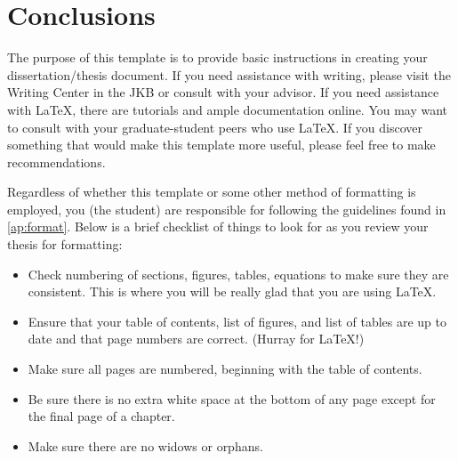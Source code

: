 \chapter{Conclusions}

The purpose of this template is to provide basic instructions in creating your dissertation/thesis document. If you need assistance with writing, please visit the Writing Center in the JKB or consult with your advisor. If you need assistance with \LaTeX, there are tutorials and ample documentation online. You may want to consult with your graduate-student peers who use \LaTeX. If you discover something that would make this template more useful, please feel free to make recommendations.

Regardless of whether this template or some other method of formatting is employed, you (the student) are responsible for following the guidelines found in \cref{ap:format}. Below is a brief checklist of things to look for as you review your thesis for formatting:
\begin{itemize}
	\item Check numbering of sections, figures, tables, equations to make sure they are consistent.	This is where you will be really glad that you are using \LaTeX.
	\item Ensure that your table of contents, list of figures, and list of tables are up to date and that page numbers are correct. (Hurray for \LaTeX!)
	\item Make sure all pages are numbered, beginning with the table of contents.
	\item Be sure there is no extra white space at the bottom of any page except for the final page of a chapter.
	\item Make sure there are no widows or orphans.
\end{itemize}

